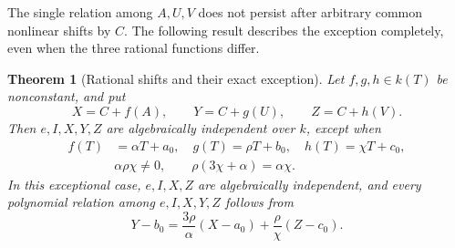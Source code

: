 \documentclass[11pt]{article}
\newtheorem{theorem}{Theorem}[section]
\theoremstyle{definition}
\theoremstyle{remark}
\begin{document}
The single relation among $A,U,V$ does not persist after arbitrary
common nonlinear shifts by $C$.  The following result describes the
exception completely, even when the three rational functions differ.

\begin{theorem}[Rational shifts and their exact exception]\label{auv:shifts}
Let $f,g,h\in k(T)$ be nonconstant, and put
\[
 X=C+f(A),\qquad Y=C+g(U),\qquad Z=C+h(V).
\]
Then $e,I,X,Y,Z$ are algebraically independent over $k$, except when
\begin{equation}\label{auv:affine-exception}
 \begin{split}
 f(T)&=\alpha T+a_0,\quad
 g(T)=\rho T+b_0,\quad h(T)=\chi T+c_0,\\
 &\alpha\rho\chi\ne0,\qquad
 \rho(3\chi+\alpha)=\alpha\chi.
 \end{split}
\end{equation}
In this exceptional case, $e,I,X,Z$ are algebraically independent,
and every polynomial relation among $e,I,X,Y,Z$ follows from
\begin{equation}\label{auv:exception-relation}
 Y-b_0=\frac{3\rho}{\alpha}(X-a_0)
                  +\frac{\rho}{\chi}(Z-c_0).
\end{equation}
\end{theorem}
\end{document}
